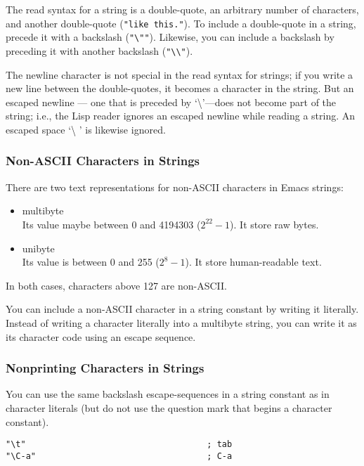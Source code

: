 The read syntax for a string is a double-quote, an arbitrary number of characters, and another double-quote (\lstinline|"like this."|).
To include a double-quote in a string, precede it with a backslash (\lstinline|"\""|).
Likewise, you can include a backslash by preceding it with another backslash (\lstinline|"\\"|).


The newline character is not special in the read syntax for strings; if you write a new line between the double-quotes, it becomes a character in the string.
But an escaped newline — one that is preceded by ‘\textbackslash{}’—does not become part of the string; i.e., the Lisp reader ignores an escaped newline while reading a string.
An escaped space ‘\textbackslash{} ’ is likewise ignored.


\subsubsection{Non-ASCII Characters in Strings}
\label{sec:non-ascii-characters}

There are two text representations for non-ASCII characters in Emacs strings:
\begin{itemize}
\item multibyte\\
  Its value maybe between 0 and 4194303 (\(2^{22}-1\)).
  It store raw bytes.
\item unibyte\\
  Its value is between 0 and 255 (\(2^{8}-1\)).
  It store human-readable text.
\end{itemize}
In both cases, characters above 127 are non-ASCII.

You can include a non-ASCII character in a string constant by writing it literally.
Instead of writing a character literally into a multibyte string, you can write it as its character code using an escape sequence. 

\subsubsection{Nonprinting Characters in Strings}
\label{sec:nonpr-char-strings}

You can use the same backslash escape-sequences in a string constant as in character literals (but do not use the question mark that begins a character constant).
\begin{lstlisting}
"\t"                                    ; tab
"\C-a"                                  ; C-a
\end{lstlisting}

